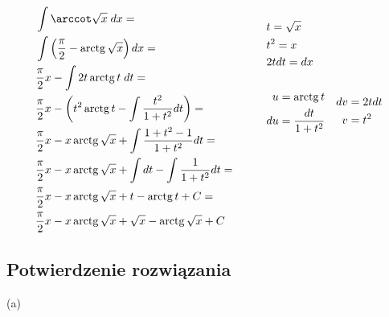 \documentclass[12pt]{article}
\renewcommand{\arctan}{\operatorname{arctg}}
\begin{document}
\begin{equation*}
    \begin{aligned}[c]
        &\int \arccot \sqrt{x} \; dx = \\
        &\int \left( \frac{\pi}{2} - \arctan \sqrt{x} \right) dx = \\
        & \frac{\pi}{2} x - \int 2t \arctan t \; dt = \\
        & \frac{\pi}{2} x - \left( t^2 \arctan t - \int \frac{t^2}{1+t^2} dt \right) = \\
        & \frac{\pi}{2} x - x \arctan \sqrt{x} + \int \frac{1+t^2-1}{1+t^2} dt = \\
        & \frac{\pi}{2} x - x \arctan \sqrt{x} + \int dt - \int\frac{1}{1+t^2} dt = \\
        & \frac{\pi}{2} x - x \arctan \sqrt{x} + t - \arctan t + C = \\
        & \frac{\pi}{2} x - x \arctan \sqrt{x} + \sqrt{x} - \arctan \sqrt{x} + C \\
    \end{aligned} \quad\quad\quad
    \begin{aligned}
        &t = \sqrt{x} \\    
        &t^2 = x \\    
        &2tdt = dx \\    
        &\text{\phantom{-}} \\
        &\begin{aligned}[c]
            u &= \arctan t \\
            du &= \frac{dt}{1+t^2} \\    
        \end{aligned} \quad
        \begin{aligned}[c]
            dv &= 2tdt\\
            v &= t^2 \\    
        \end{aligned} \\
        &\text{\phantom{-}} \\ &\text{\phantom{-}} \\ &\text{\phantom{-}} \\ &\text{\phantom{-}} \\ &\text{\phantom{-}} \\
    \end{aligned}
\end{equation*}

\subsection{Potwierdzenie rozwiązania}
(a)
\end{document}
